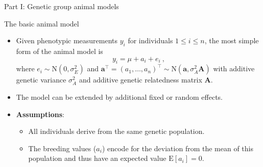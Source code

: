 \documentclass[10pt,ignorenonframetext,]{beamer}
\providecommand{\tightlist}{%
  \setlength{\itemsep}{0pt}\setlength{\parskip}{0pt}}
\begin{document}
\begin{frame}{Part I: Genetic group animal models}
\protect\hypertarget{part-i-genetic-group-animal-models}{}

\begin{block}{The basic animal model}

\vspace{3mm}

\begin{itemize}
\tightlist
\item
  Given phenotypic measurements \(y_i\) for individuals
  \(1\leq i \leq n\), the most simple form of the animal model is \[
  y_i = \mu + a_i + e_i \ ,
  \] where \(e_i \sim \text{N}(0,\sigma_E^2)\) and
  \({\mathbf a}^\top = (a_1, \ldots, a_n)^\top \sim \text{N}({\mathbf a},\sigma_A^2 \mathbf{A})\)
  with additive genetic variance \(\sigma_A^2\) and additive genetic
  relatedness matrix \(\mathbf{A}\).
\end{itemize}

\vspace{3mm}

\begin{itemize}
\item
  The model can be extended by additional fixed or random effects.\\
  \vspace{3mm}
\item
  \textbf{Assumptions}:

  \begin{itemize}
  \tightlist
  \item
    All individuals derive from the same genetic population.
  \item
    The breeding values (\(a_i\)) encode for the deviation from the mean
    of this population and thus have an expected value
    \(\text{E}[a_i]=0\).
  \end{itemize}
\end{itemize}

\end{block}

\end{frame}
\end{document}
